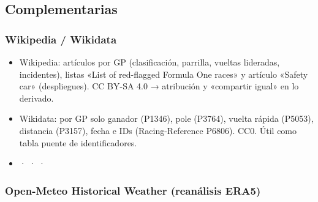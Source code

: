 \href{https://forums.autosport.com/topic/191857-historical-pitstop-laptime-information-needed-for-exciting-project/}{}

\subsection{Complementarias}

\subsubsection{Wikipedia / Wikidata}

\begin{itemize}
\item Wikipedia: artículos por GP (clasificación, parrilla, vueltas lideradas, incidentes), listas «List of red-flagged Formula One races» y artículo «Safety car» (despliegues). CC BY-SA 4.0 → atribución y «compartir igual» en lo derivado.
\item Wikidata: por GP solo ganador (P1346), pole (P3764), vuelta rápida (P5053), distancia (P3157), fecha e IDs (Racing-Reference P6806). CC0. Útil como tabla puente de identificadores.
\item \href{https://en.wikipedia.org/wiki/List_of_red-flagged_Formula_One_races}{} · \href{https://en.wikipedia.org/wiki/Safety_car}{} · \href{https://www.wikidata.org/wiki/Q171864}{} · \href{https://query.wikidata.org/}{}
\end{itemize}

\subsubsection{Open-Meteo Historical Weather (reanálisis ERA5)}

